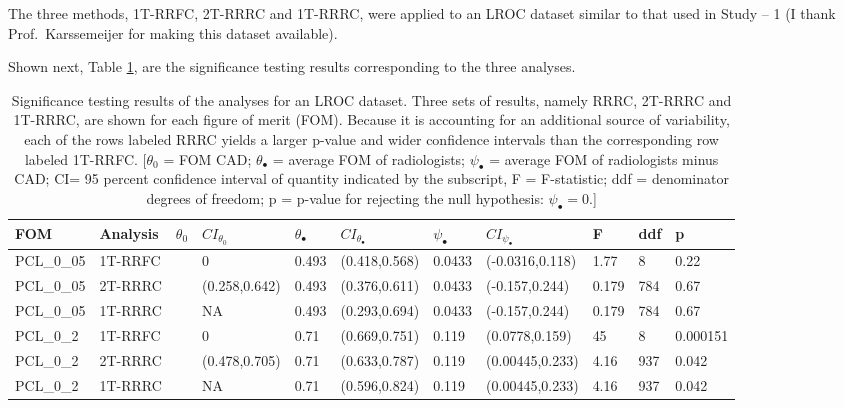 \documentclass[
]{book}
\begin{document}
The three methods, 1T-RRFC, 2T-RRRC and 1T-RRRC, were applied to an LROC dataset similar to that used in Study -- 1 (I thank Prof.~Karssemeijer for making this dataset available).

Shown next, Table \ref{tab:standalone-cad-table2}, are the significance testing results corresponding to the three analyses.

\begin{table}

\caption{\label{tab:standalone-cad-table2}Significance testing results of the analyses for an LROC dataset. Three sets of results, namely RRRC, 2T-RRRC and 1T-RRRC, are shown for each figure of merit (FOM). Because it is accounting for an additional source of variability, each of the rows labeled RRRC yields a larger p-value and wider confidence intervals than the corresponding row labeled 1T-RRFC. [$\theta_0$ = FOM CAD; $\theta_{\bullet}$ = average FOM of radiologists; $\psi_{\bullet}$ = average FOM of radiologists minus CAD; CI= 95 percent confidence interval of quantity indicated by the subscript, F = F-statistic; ddf = denominator degrees of freedom; p = p-value for rejecting the null hypothesis: $\psi_{\bullet} = 0$.]}
\centering
\fontsize{10}{12}\selectfont
\begin{tabular}[t]{lllllllllll}
\toprule
FOM & Analysis & $\theta_0$ & $CI_{\theta_0}$ & $\theta_{\bullet}$ & $CI_{\theta_{\bullet}}$ & $\psi_{\bullet}$ & $CI_{\psi_{\bullet}}$ & F & ddf & p\\
\midrule
PCL\_0\_05 & 1T-RRFC &  & 0 & 0.493 & (0.418,0.568) & 0.0433 & (-0.0316,0.118) & 1.77 & 8 & 0.22\\
\cmidrule{1-2}
\cmidrule{4-11}
PCL\_0\_05 & 2T-RRRC &  & (0.258,0.642) & 0.493 & (0.376,0.611) & 0.0433 & (-0.157,0.244) & 0.179 & 784 & 0.67\\
\cmidrule{1-2}
\cmidrule{4-11}
PCL\_0\_05 & 1T-RRRC & \multirow{-3}{*}{\raggedright\arraybackslash 0.45} & NA & 0.493 & (0.293,0.694) & 0.0433 & (-0.157,0.244) & 0.179 & 784 & 0.67\\
\cmidrule{1-11}
PCL\_0\_2 & 1T-RRFC &  & 0 & 0.71 & (0.669,0.751) & 0.119 & (0.0778,0.159) & 45 & 8 & 0.000151\\
\cmidrule{1-2}
\cmidrule{4-11}
PCL\_0\_2 & 2T-RRRC &  & (0.478,0.705) & 0.71 & (0.633,0.787) & 0.119 & (0.00445,0.233) & 4.16 & 937 & 0.042\\
\cmidrule{1-2}
\cmidrule{4-11}
PCL\_0\_2 & 1T-RRRC & \multirow{-3}{*}{\raggedright\arraybackslash 0.592} & NA & 0.71 & (0.596,0.824) & 0.119 & (0.00445,0.233) & 4.16 & 937 & 0.042\\

\end{tabular}
\end{table}
\end{document}
